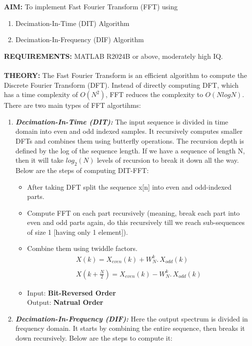 \documentclass[12pt]{report}
\begin{document}
  \noindent \textbf{AIM:} To implement Fast Fourier Transform (FFT) using
  \begin{enumerate}
    \item Decimation-In-Time (DIT) Algorithm
    \item Decimation-In-Frequency (DIF) Algorithm
  \end{enumerate}

  \noindent \textbf{REQUIREMENTS:} MATLAB R2024B or above, moderately high IQ. \\ \\ 
  \textbf{THEORY:} The Fast Fourier Transform is an efficient algorithm to compute the Discrete Fourier Transform (DFT). Instead of directly computing DFT, which has a time complexity of $O (N^2)$, FFT reduces the complexity to $ O(N logN) $. There are two main types of FFT algortihms:
  \begin{enumerate}
    \item \textbf{\textit{Decimation-In-Time (DIT):}} The input sequence is divided in time domain into even and odd indexed samples. It recursively computes smaller DFTs and combines them using butterfly operations. The recursion depth is defined by the log of the sequence length. If we have a sequence of length N, then it will take $log_2 (N)$ levels of recursion to break it down all the way. Below are the steps of computing DIT-FFT: \cite{profnotes}
      \begin{itemize}
        \item After taking DFT split the sequence x[n] into even and odd-indexed parts.
        \item Compute FFT on each part recursively (meaning, break each part into even and odd parts again, do this recursively till we reach sub-sequences of size 1 [having only 1 element]).
        \item Combine them using twiddle factors. 
          \begin{gather*}
            X(k) = X_{even} (k) + W_{N}^{k} . \, X_{odd} (k) \\ \\
            X \left(k + \frac{N}{2} \right) = X_{even} (k) - W_{N}^{k} . \, X_{odd} (k) 
          \end{gather*}
        \item Input: \textbf{Bit-Reversed Order} \\ Output: \textbf{Natrual Order}
      \end{itemize}
    \item \textbf{\textit{Decimation-In-Frequency (DIF):}} Here the output spectrum is divided in frequency domain. It starts by combining the entire sequence, then breaks it down recursively. Below are the steps to compute it:

\end{enumerate}
\end{document}
